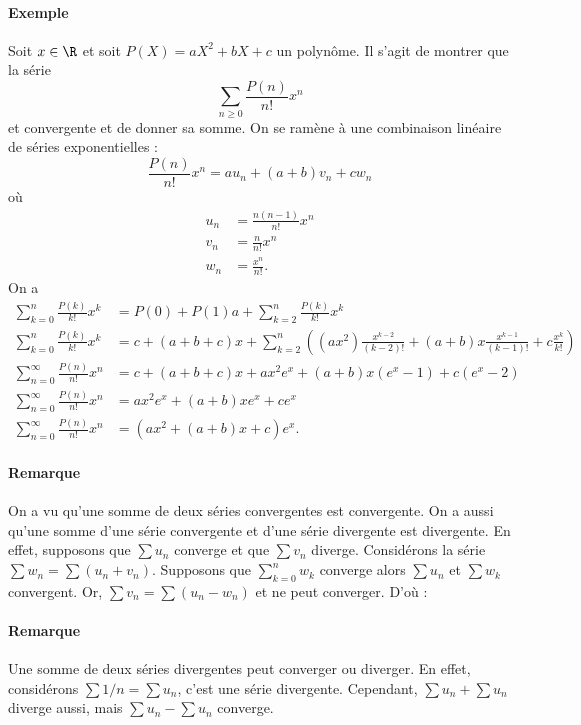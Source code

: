 \documentclass{livre}
\begin{document}
\paragraph{Exemple}Soit $x\in \R$ et soit $P(X) = aX^{2}+ bX + c$ un polynôme. Il s'agit de montrer que la série \[ \sum_{n\geq 0}\frac{P(n)}{n!}x^{n}\]et convergente et de donner sa somme. On se ramène à une combinaison linéaire de séries exponentielles : \[ \frac{P(n)}{n!}x^{n} = au_n + (a+b) v_n + cw_n\]où 
\begin{align*}
u_n &= \frac{n(n-1)}{n!}x^{n} \\
v_n &= \frac{n}{n!}x^{n}\\
w_n &= \frac{x^{n}}{n!}.
\end{align*}
On a 
\begin{align*}
\sum_{k=0}^{n} \frac{P(k)}{k!}x^{k} &= P(0) + P(1) a + \sum_{k=2}^{n}\frac{P(k)}{k!}x^{k}\\
\sum_{k=0}^{n} \frac{P(k)}{k!}x^{k} &=c + (a+b+c)x + \sum_{k=2}^{n}\left( (ax^{2})\frac{x^{k-2}}{(k-2)!} + (a+b)x \frac{x^{k-1}}{(k-1)!} + c\frac{x^{k}}{k!}\right)\\
\sum_{n=0}^{\infty}\frac{P(n)}{n!}x^{n} &= c + (a+b+c)x + ax^{2}e^{x} + (a+b)x(e^{x}-1) + c(e^{x} -2)\\
\sum_{n=0}^{\infty}\frac{P(n)}{n!}x^{n} &= ax^{2}e^{x} + (a+b)xe^{x} + ce^{x}\\
\sum_{n=0}^{\infty}\frac{P(n)}{n!}x^{n} &= (ax^{2}+(a+b)x+c)e^{x}.
\end{align*}

\paragraph{Remarque}On a vu qu'une somme de deux séries convergentes est convergente. On a aussi qu'une somme d'une série convergente et d'une série divergente est divergente. En effet, supposons que $\sum u_n$ converge et que $\sum v_n$ diverge. Considérons la série $\sum w_n = \sum (u_n + v_n).$ Supposons que $\sum_{k=0}^{n}w_k$ converge alors $\sum u_n$ et $\sum w_k$ convergent. Or, $\sum v_n = \sum (u_n - w_n)$ et ne peut converger.
D'où :
\paragraph{Remarque}Une somme de deux séries divergentes peut converger ou diverger. En effet, considérons $\sum 1/n = \sum u_n$, c'est une série divergente. Cependant, $\sum u_n + \sum u_n$ diverge aussi, mais $\sum u_n - \sum u_n$ converge.
\end{document}
